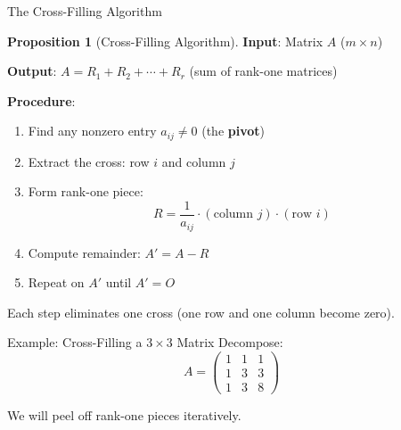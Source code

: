 \documentclass[10pt]{beamer}
\theoremstyle{definition}
\newtheorem{prop}{Proposition}[section]
\newcommand{\x}[1]{\alert{\textbf{#1}}}
\begin{document}
\begin{frame}[fragile]{The Cross-Filling Algorithm}
\begin{prop}[Cross-Filling Algorithm]
\textbf{Input}: Matrix $A$ ($m \times n$)

\textbf{Output}: $A = R_1 + R_2 + \cdots + R_r$ (sum of rank-one matrices)

\textbf{Procedure}:
\begin{enumerate}
\item Find any nonzero entry $a_{ij} \neq 0$ (the \x{pivot})

\hspace{1cm}

\item Extract the cross: row $i$ and column $j$
\item Form rank-one piece:
$$R = \frac{1}{a_{ij}} \cdot (\text{column } j) \cdot (\text{row } i)$$
\item Compute remainder: $A' = A - R$
\item Repeat on $A'$ until $A' = O$
\end{enumerate}
\end{prop}

\vspace{0.2cm}
Each step eliminates one cross (one row and one column become zero).
\end{frame}

\begin{frame}{Example: Cross-Filling a $3 \times 3$ Matrix}
Decompose:
$$A = \begin{pmatrix}
1 & 1 & 1 \\
1 & 3 & 3 \\
1 & 3 & 8
\end{pmatrix}$$

\vfill
We will peel off rank-one pieces iteratively.
\end{frame}
\end{document}
